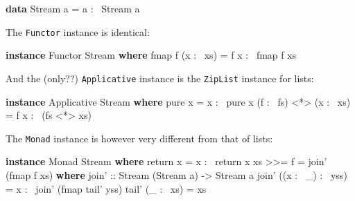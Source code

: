\documentclass[]{article}
\newenvironment{Shaded}{\begin{snugshade}}{\end{snugshade}}
\newcommand{\DataTypeTok}[1]{\textcolor[rgb]{0.13,0.29,0.53}{#1}}
\newcommand{\FunctionTok}[1]{\textcolor[rgb]{0.00,0.00,0.00}{#1}}
\newcommand{\KeywordTok}[1]{\textcolor[rgb]{0.13,0.29,0.53}{\textbf{#1}}}
\newcommand{\NormalTok}[1]{#1}
\newcommand{\OtherTok}[1]{\textcolor[rgb]{0.56,0.35,0.01}{#1}}
\begin{document}
\begin{Shaded}
\begin{Highlighting}[]
\KeywordTok{data} \DataTypeTok{Stream}\NormalTok{ a }\FunctionTok{=}\NormalTok{ a }\FunctionTok{:~} \DataTypeTok{Stream}\NormalTok{ a}
\end{Highlighting}
\end{Shaded}

The \texttt{Functor} instance is identical:

\begin{Shaded}
\begin{Highlighting}[]
\KeywordTok{instance} \DataTypeTok{Functor} \DataTypeTok{Stream} \KeywordTok{where}
\NormalTok{    fmap f (x }\FunctionTok{:~}\NormalTok{ xs) }\FunctionTok{=}\NormalTok{ f x }\FunctionTok{:~}\NormalTok{ fmap f xs}
\end{Highlighting}
\end{Shaded}

And the (only??) \texttt{Applicative} instance is the \texttt{ZipList} instance
for lists:

\begin{Shaded}
\begin{Highlighting}[]
\KeywordTok{instance} \DataTypeTok{Applicative} \DataTypeTok{Stream} \KeywordTok{where}
\NormalTok{    pure x }\FunctionTok{=}\NormalTok{ x }\FunctionTok{:~}\NormalTok{ pure x}
\NormalTok{    (f }\FunctionTok{:~}\NormalTok{ fs) }\FunctionTok{<*>}\NormalTok{ (x }\FunctionTok{:~}\NormalTok{ xs) }\FunctionTok{=}\NormalTok{ f x }\FunctionTok{:~}\NormalTok{ (fs }\FunctionTok{<*>}\NormalTok{ xs)}
\end{Highlighting}
\end{Shaded}

The \texttt{Monad} instance is however very different from that of lists:

\begin{Shaded}
\begin{Highlighting}[]
\KeywordTok{instance} \DataTypeTok{Monad} \DataTypeTok{Stream} \KeywordTok{where}
\NormalTok{    return x }\FunctionTok{=}\NormalTok{ x }\FunctionTok{:~}\NormalTok{ return x}
\NormalTok{    xs }\FunctionTok{>>=}\NormalTok{ f }\FunctionTok{=}\NormalTok{ join' (fmap f xs)}
      \KeywordTok{where}
\OtherTok{        join' ::} \DataTypeTok{Stream}\NormalTok{ (}\DataTypeTok{Stream}\NormalTok{ a) }\OtherTok{->} \DataTypeTok{Stream}\NormalTok{ a}
\NormalTok{        join' ((x }\FunctionTok{:~}\NormalTok{ _) }\FunctionTok{:~}\NormalTok{ yss) }\FunctionTok{=}\NormalTok{ x }\FunctionTok{:~}\NormalTok{ join' (fmap tail' yss)}
\NormalTok{        tail' (_ }\FunctionTok{:~}\NormalTok{ xs) }\FunctionTok{=}\NormalTok{ xs}
\end{Highlighting}
\end{Shaded}
\end{document}
